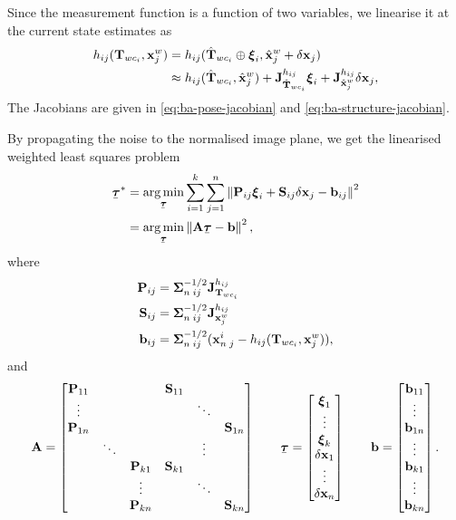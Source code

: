 Since the measurement function is a function of two variables, we linearise it at the current state estimates as
\begin{subequations}
\begin{align}
    h_{ij}({\boldsymbol{\mathbf{T}}}_{wc_i}, {\boldsymbol{\mathbf{x}}}^w_j) &= h_{ij}(\hat{{\boldsymbol{\mathbf{T}}}}_{wc_i} \oplus {\boldsymbol{\mathbf{\xi}}}_i, \hat{{\boldsymbol{\mathbf{x}}}}^w_j + \delta{\boldsymbol{\mathbf{x}}}_j) \\
    &\approx h_{ij}(\hat{{\boldsymbol{\mathbf{T}}}}_{wc_i}, \hat{{\boldsymbol{\mathbf{x}}}}^w_j) + {{\boldsymbol{\mathbf{J}}}^{h_{ij}}_{\hat{{\boldsymbol{\mathbf{T}}}}_{wc_i}}}{\boldsymbol{\mathbf{\xi}}}_i + {{\boldsymbol{\mathbf{J}}}^{h_{ij}}_{\hat{{\boldsymbol{\mathbf{x}}}}^w_j}}\delta{\boldsymbol{\mathbf{x}}}_j,
\end{align}
\end{subequations}
The Jacobians are given in \eqref{eq:ba-pose-jacobian} and \eqref{eq:ba-structure-jacobian}.

By propagating the noise to the normalised image plane, we get the linearised weighted least squares problem
\begin{align}
  \ubar{\vectau}^\ast &= \argmin_{\ubar{\vectau}} \sum^k_{i=1} \sum^n_{j=1} \norm{ \matP_{ij} \vecxi_i + \matS_{ij} \delta\vecx_j - \vecb_{ij}}^2\\
  &= \argmin_{\ubar{\vectau}} \norm{ \matA \ubar{\vectau} - \vecb}^2,
\end{align}
where
\begin{align}
  {\boldsymbol{\mathbf{P}}}_{ij} &= {\boldsymbol{\mathbf{\Sigma}}}^{-1/2}_{n \; {ij}} {{\boldsymbol{\mathbf{J}}}^{h_{ij}}_{{\boldsymbol{\mathbf{T}}}_{wc_i}}}\\
  {\boldsymbol{\mathbf{S}}}_{ij} &= {\boldsymbol{\mathbf{\Sigma}}}^{-1/2}_{n \; {ij}} {{\boldsymbol{\mathbf{J}}}^{h_{ij}}_{{\boldsymbol{\mathbf{x}}}^w_j}}\\
  {\boldsymbol{\mathbf{b}}}_{ij} &= {\boldsymbol{\mathbf{\Sigma}}}^{-1/2}_{n \; {ij}} ({\boldsymbol{\mathbf{x}}}_{n \; j}^i - h_{ij}({\boldsymbol{\mathbf{T}}}_{wc_i}, {\boldsymbol{\mathbf{x}}}^w_j)),
\end{align}
and
\begin{equation} \label{eq:ba-matrices}
  \matA =  
  \begin{bmatrix}
    \matP_{11} &  &  & \matS_{11} & & \\
    \vdots & & & & \ddots & \\
    \matP_{1n} & & & & &\matS_{1n}\\
    & \ddots &  & & \vdots &\\
    & & \matP_{k1} & \matS_{k1} & & \\
    & & \vdots & & \ddots & \\
    & & \matP_{kn}& & &\matS_{kn}
  \end{bmatrix}
  \qquad  
  \ubar{\vectau} =
  \begin{bmatrix}
    \vecxi_1\\
    \vdots\\
    \vecxi_k\\
    \delta\vecx_1\\
    \vdots\\
    \delta\vecx_n
  \end{bmatrix}
  \qquad
  \vecb =  
  \begin{bmatrix}
    \vecb_{11}\\
    \vdots\\
    \vecb_{1n}\\
    \vdots\\
    \vecb_{k1}\\
    \vdots\\
    \vecb_{kn}
  \end{bmatrix}.
\end{equation}

